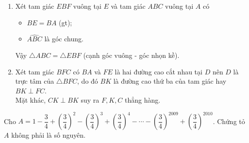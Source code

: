 \begin{ex}
{\begin{enumerate}
\begin{itemize}
		\end{itemize}
	Vậy $\triangle BAD=\triangle BED$ (c.g.c),
	suy ra $\widehat{DEB}=\widehat{DAB}$ (hai góc tương ứng), mà $\widehat{DAB}=90^\circ$ suy ra $\widehat{DEB}=90^\circ$ hay $DE \perp BC$.
	\item Xét tam giác $EBF$ vuông tại $E$ và tam giác $ABC$ vuông tại $A$ có
		\begin{itemize}
			\item $BE=BA$ (gt);
			\item $\widehat{ABC}$ là góc chung.
		\end{itemize}
	Vậy $\triangle ABC=\triangle EBF$ (cạnh góc vuông - góc nhọn kề).
	\item Xét tam giác $BFC$ có $BA$ và $FE$ là hai đường cao cắt nhau tại $D$ nên $D$ là trực tâm của $\triangle BFC$, do đó $BK$ là đường cao thứ ba của tam giác hay $BK \perp FC$.\\
	Mặt khác, $CK \perp BK$ suy ra $F, K, C$ thẳng hàng.
\end{enumerate}	
}
\end{ex}

\begin{ex}%
Cho $A=1-\dfrac{3}{4}+\left(\dfrac{3}{4}\right)^2-\left(\dfrac{3}{4}\right)^3+\left(\dfrac{3}{4}\right)^4-\cdots - \left(\dfrac{3}{4}\right)^{2009}+\left(\dfrac{3}{4}\right)^{2010}$. Chứng tỏ $A$ không phải là số nguyên.
\end{ex}

